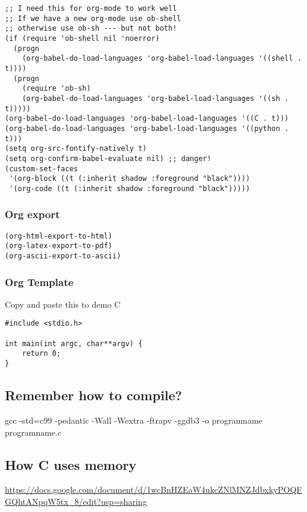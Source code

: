 \documentclass[11pt]{article}
\begin{document}
\begin{verbatim}
;; I need this for org-mode to work well
;; If we have a new org-mode use ob-shell
;; otherwise use ob-sh --- but not both!
(if (require 'ob-shell nil 'noerror)
  (progn
    (org-babel-do-load-languages 'org-babel-load-languages '((shell . t))))
  (progn
    (require 'ob-sh)
    (org-babel-do-load-languages 'org-babel-load-languages '((sh . t)))))
(org-babel-do-load-languages 'org-babel-load-languages '((C . t)))
(org-babel-do-load-languages 'org-babel-load-languages '((python . t)))
(setq org-src-fontify-natively t)
(setq org-confirm-babel-evaluate nil) ;; danger!
(custom-set-faces
 '(org-block ((t (:inherit shadow :foreground "black"))))
 '(org-code ((t (:inherit shadow :foreground "black")))))
\end{verbatim}

\subsubsection{Org export}
\label{sec:org2da4716}
\begin{verbatim}
(org-html-export-to-html)
(org-latex-export-to-pdf)
(org-ascii-export-to-ascii)
\end{verbatim}


\subsubsection{Org Template}
\label{sec:orge1fe7d2}
Copy and paste this to demo C

\begin{verbatim}
#include <stdio.h>

int main(int argc, char**argv) {
    return 0;
}
\end{verbatim}

\subsection{Remember how to compile?}
\label{sec:orgccfc772}

gcc  -std=c99 -pedantic -Wall -Wextra -ftrapv -ggdb3 -o programname programname.c


\subsection{How C uses memory}
\label{sec:orgdab645e}

\url{https://docs.google.com/document/d/1wcBnHZEaW4ukcZNlMNZJdbxkyPOQFGQhtANpqW5tx\_8/edit?usp=sharing}
\end{document}
